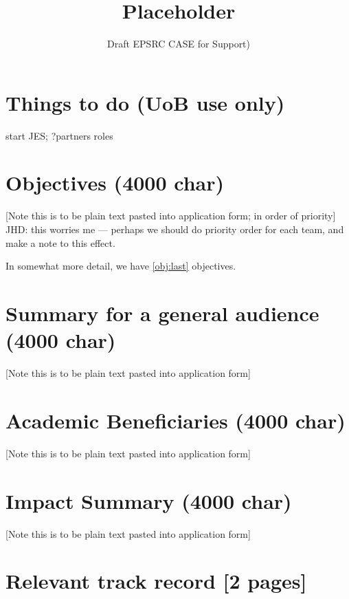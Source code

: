 \documentclass[11pt]{article}
\begin{document}
\title{Placeholder}
\author{Draft EPSRC CASE for Support)}
\maketitle
\ifinternal
\section*{Things to do (UoB use only)}
\begin{enumerateshort}
\item start JES; ?partners roles
\end{enumerateshort}
\pagebreak
\fi
\section*{Objectives (4000 char)}
[Note this is to be plain text pasted into application form; in order of priority]
JHD: this worries me --- perhaps we should do priority order for each team, and make a note to this effect.


In somewhat more detail, we have \ref{obj:last} objectives.





\pagebreak
\section*{Summary for a general audience (4000 char)}
[Note this is to be plain text pasted into application form]



\pagebreak
\section*{Academic Beneficiaries (4000 char)}
[Note this is to be plain text pasted into application form]%



\pagebreak
\section*{Impact Summary (4000 char)}
[Note this is to be plain text pasted into application form]

 

\pagebreak
\section*{Relevant track record [2 pages]}

\pagebreak
\end{document}
